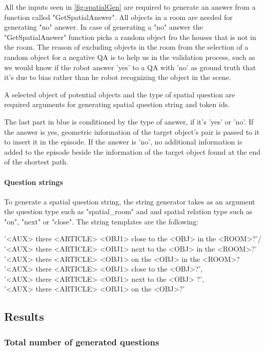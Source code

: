 All the inputs seen in \ref{fig:spatialGen} are required to generate an answer from a function called "GetSpatialAnswer". All objects in a room are needed for generating "no" answer. In case of generating a "no" answer the "GetSpatialAnswer" function picks a random object fro the houses that is not in the room. The reason of excluding objects in the room from the selection of a random object for a negative QA is to help us in the validation process, such as we would know if the robot answer 'yes' to a QA with 'no' as ground truth that it's due to bias rather than he robot recognizing the object in the scene. 

A selected object of potential objects and the type of spatial question are required arguments for generating spatial question string and token ids. 

The last part in blue is conditioned by the type of answer, if it's 'yes' or 'no'. If the answer is yes, geometric information of the target object's pair is passed to it to insert it in the episode. If the answer is 'no', no additional information is added to the episode beside the information of the target object found at the end of the shortest path. 
\paragraph{Question strings}

To generate a spatial question string, the string generator takes as an argument the question type such as "spatial\_room" and and spatial relation type such as "on", "next" or "close". The string templates are the following: 

'<AUX> there <ARTICLE> <OBJ1> close to the <OBJ> in the <ROOM>?'/\\
'<AUX> there <ARTICLE>  <OBJ1> next to the <OBJ> in the <ROOM>?' \\
'<AUX>  there <ARTICLE> <OBJ1> on the <OBJ> in the <ROOM>?\\
'<AUX> there <ARTICLE> <OBJ1> close to the <OBJ>?',\\
'<AUX>  there <ARTICLE> <OBJ1> next to the <OBJ> ?',\\
'<AUX>  there <ARTICLE> <OBJ1> on the <OBJ>?'


\subsection{Results}

\subsubsection{Total number of generated questions}

